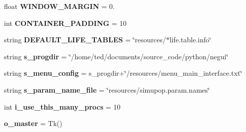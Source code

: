 \begin{DoxyCompactItemize}
\item 
float {\bfseries W\+I\+N\+D\+O\+W\+\_\+\+M\+A\+R\+G\+IN} = 0.\hypertarget{namespacenegui_1_1pghostnotebook_a55d2191bb5b0ad01afd889f86f3a40cd}{}\label{namespacenegui_1_1pghostnotebook_a55d2191bb5b0ad01afd889f86f3a40cd}

\item 
int {\bfseries C\+O\+N\+T\+A\+I\+N\+E\+R\+\_\+\+P\+A\+D\+D\+I\+NG} = 10\hypertarget{namespacenegui_1_1pghostnotebook_a42838e920b3780dca9f1146ac8fc9e94}{}\label{namespacenegui_1_1pghostnotebook_a42838e920b3780dca9f1146ac8fc9e94}

\item 
string {\bfseries D\+E\+F\+A\+U\+L\+T\+\_\+\+L\+I\+F\+E\+\_\+\+T\+A\+B\+L\+ES} = \char`\"{}resources/$\ast$life.\+table.\+info\char`\"{}\hypertarget{namespacenegui_1_1pghostnotebook_a457461504a6b64ca6a744229aa15ea2f}{}\label{namespacenegui_1_1pghostnotebook_a457461504a6b64ca6a744229aa15ea2f}

\item 
string {\bfseries s\+\_\+progdir} = \char`\"{}/home/ted/documents/source\+\_\+code/python/negui\char`\"{}\hypertarget{namespacenegui_1_1pghostnotebook_aa6cd5fa1b19e89804b4e7029b7865fab}{}\label{namespacenegui_1_1pghostnotebook_aa6cd5fa1b19e89804b4e7029b7865fab}

\item 
string {\bfseries s\+\_\+menu\+\_\+config} = s\+\_\+progdir+\char`\"{}/resources/menu\+\_\+main\+\_\+interface.\+txt\char`\"{}\hypertarget{namespacenegui_1_1pghostnotebook_a847977d3fdbc31ec5347dba41127fda2}{}\label{namespacenegui_1_1pghostnotebook_a847977d3fdbc31ec5347dba41127fda2}

\item 
string {\bfseries s\+\_\+param\+\_\+name\+\_\+file} = \char`\"{}resources/simupop.\+param.\+names\char`\"{}\hypertarget{namespacenegui_1_1pghostnotebook_ac50c371dc355daca2be8c0c69bd5a8a1}{}\label{namespacenegui_1_1pghostnotebook_ac50c371dc355daca2be8c0c69bd5a8a1}

\item 
int {\bfseries i\+\_\+use\+\_\+this\+\_\+many\+\_\+procs} = 10\hypertarget{namespacenegui_1_1pghostnotebook_a441515e865818dcb1e4dad534fd174e8}{}\label{namespacenegui_1_1pghostnotebook_a441515e865818dcb1e4dad534fd174e8}

\item 
{\bfseries o\+\_\+master} = Tk()\hypertarget{namespacenegui_1_1pghostnotebook_a87f3638cc6a59f9037d9f965f0f37538}{}\label{namespacenegui_1_1pghostnotebook_a87f3638cc6a59f9037d9f965f0f37538}


\end{DoxyCompactItemize}
